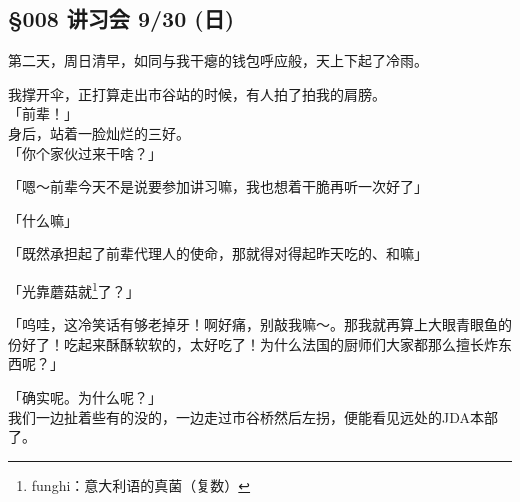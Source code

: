 \subsection{§008 讲习会 9/30 (日)}

第二天，周日清早，如同与我干瘪的钱包呼应般，天上下起了冷雨。

我撑开伞，正打算走出市谷站的时候，有人拍了拍我的肩膀。\\

「前辈！」\\

身后，站着一脸灿烂的三好。\\

「你个家伙过来干啥？」

「嗯～前辈今天不是说要参加讲习嘛，我也想着干脆再听一次好了」

「什么嘛」

「既然承担起了前辈代理人的使命，那就得对得起昨天吃的、和嘛」

「光靠蘑菇就\footnote{funghi：意大利语的真菌（复数）}了？」

「呜哇，这冷笑话有够老掉牙！啊好痛，别敲我嘛～。那我就再算上大眼青眼鱼的份好了！吃起来酥酥软软的，太好吃了！为什么法国的厨师们大家都那么擅长炸东西呢？」

「确实呢。为什么呢？」\\

我们一边扯着些有的没的，一边走过市谷桥然后左拐，便能看见远处的JDA本部了。\\

